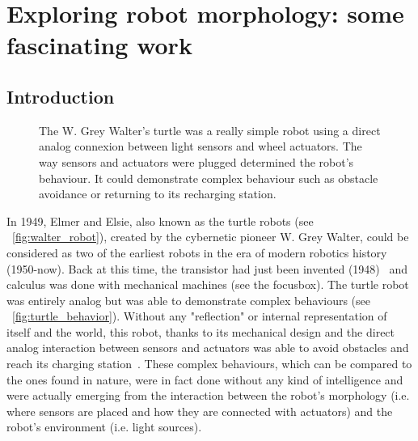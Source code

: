 
\cleartoleftpage


\chapter{Exploring robot morphology: some fascinating work} %
\label{cha:morphology-review}


\section{Introduction} %

\begin{figure}[!b]
\centering
    \hfil
    \caption{The W. Grey Walter's turtle was a really simple robot using a direct analog connexion between light sensors and wheel actuators. The way sensors and actuators were plugged determined the robot’s behaviour. It could demonstrate complex behaviour such as obstacle avoidance or returning to its recharging station.}
    \label{fig:turtle_robot}
\end{figure}


In 1949, Elmer and Elsie, also known as the turtle robots (see \figurename~\ref{fig:walter_robot}), created by the cybernetic pioneer W. Grey Walter, could be considered as two of the earliest robots in the era of modern robotics history (1950-now). Back at this time, the transistor had just been invented (1948)~\parencite{brinkman1997history} and calculus was done with mechanical machines (see the focusbox). The turtle robot was entirely analog but was able to demonstrate complex behaviours (see \figurename~\ref{fig:turtle_behavior}). Without any "reflection" or internal representation of itself and the world, this robot, thanks to its mechanical design and the direct analog interaction between sensors and actuators was able to avoid obstacles and reach its charging station~\parencite{walter1950imitation}.
These complex behaviours, which can be compared to the ones found in nature, were in fact done without any kind of intelligence and were actually emerging from the interaction between the robot’s morphology (i.e. where sensors are placed and how they are connected with actuators) and the robot’s environment (i.e. light sources).


